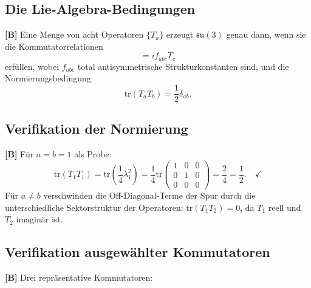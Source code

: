 \subsection{Die Lie-Algebra-Bedingungen}

\textbf{[B]} Eine Menge von acht Operatoren $\{T_a\}$ erzeugt
$\mathfrak{su}(3)$ genau dann, wenn sie die Kommutatorrelationen
\begin{equation}
  [T_a, T_b] = i f_{abc} T_c
  \label{eq:kommutator}
\end{equation}
erfüllen, wobei $f_{abc}$ total antisymmetrische
Strukturkonstanten sind, und die Normierungsbedingung
\begin{equation}
  \mathrm{tr}(T_a T_b) = \frac{1}{2}\delta_{ab}.
  \label{eq:normierung}
\end{equation}

\subsection{Verifikation der Normierung}

\textbf{[B]} Für $a = b = 1$ als Probe:
\begin{equation}
  \mathrm{tr}(T_1 T_1) = \mathrm{tr}\!\left(
  \frac{1}{4}\lambda_1^2\right)
  = \frac{1}{4}\mathrm{tr}
  \begin{pmatrix}1&0&0\\0&1&0\\0&0&0\end{pmatrix}
  = \frac{2}{4} = \frac{1}{2}.\quad\checkmark
  \label{eq:norm_probe}
\end{equation}
Für $a \neq b$ verschwinden die Off-Diagonal-Terme der Spur durch
die unterschiedliche Sektorstruktur der Operatoren:
$\mathrm{tr}(T_1 T_2) = 0$, da $T_1$ reell und $T_2$ imaginär ist.

\subsection{Verifikation ausgewählter Kommutatoren}

\textbf{[B]} Drei repräsentative Kommutatoren:

